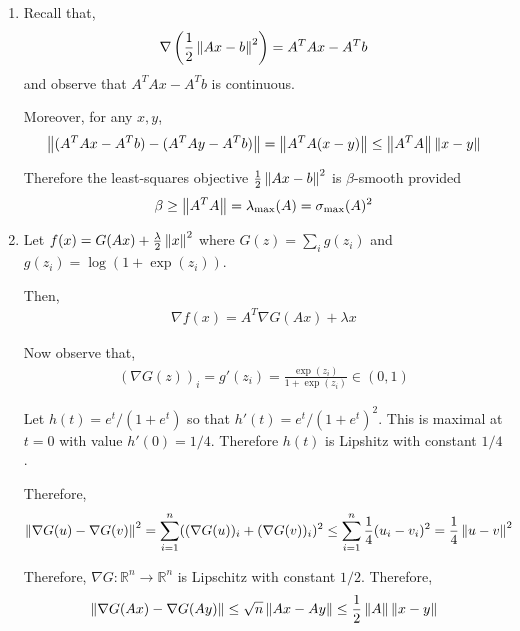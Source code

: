 \documentclass[10pt]{article}
\begin{document}
\begin{solution}[Solution]
\begin{enumerate}[label=(\alph*)]
    \item
        Recall that,
        \begin{align*}
            \nabla \left(\frac{1}{2} \left\lVert Ax-b\right\rVert^2\right)
            = A^TAx - A^Tb
        \end{align*}
        and observe that \( A^TAx-A^Tb \) is continuous.

        Moreover, for any \( x,y \),
        \begin{align*}
            \left\lVert(A^TAx-A^Tb) - (A^TAy-A^Tb)\right\rVert
            = \left\lVert A^TA(x-y)\right\rVert
            \leq \left\lVert A^TA\right\rVert \left\lVert x-y\right\rVert
        \end{align*}
        
        Therefore the least-squares objective \( \frac{1}{2}\left\lVert Ax-b\right\rVert^2 \) is \( \beta \)-smooth provided
        \begin{align*}
            \beta \geq \left\lVert A^TA\right\rVert = \lambda_{\max}(A) = \sigma_{\max}(A)^2
        \end{align*}

    \item
        Let \( f(x) = G(Ax) + \frac{\lambda}{2} \left\lVert x\right\rVert^2 \) where \( G(z) = \sum_{i} g(z_i) \) and \( g(z_i) = \log(1+\exp(z_i)) \).

        Then,
        \begin{align*}
            \nabla f(x) = A^T \nabla G(Ax) + \lambda x
        \end{align*}

        Now observe that,
        \begin{align*}
            (\nabla G(z))_i = g'(z_i) = \frac{\exp(z_i)}{1+\exp(z_i)} \in(0, 1)
        \end{align*}
        
        Let \( h(t) = e^t/(1+e^t) \) so that \( h'(t) = e^{t}/(1+e^t)^2 \). This is maximal at \( t=0 \) with value \( h'(0) = 1/4 \). Therefore \( h(t) \) is Lipshitz with constant \( 1/4 \).

        Therefore,
        \begin{align*}
            \left\lVert\nabla G(u) - \nabla G(v)\right\rVert^2 
            &= \sum_{i=1}^{n} ((\nabla G(u))_i + (\nabla G(v))_i)^2
            \leq \sum_{i=1}^{n} \frac{1}{4}(u_i-v_i)^2
            = \frac{1}{4}\left\lVert u-v\right\rVert^2
        \end{align*}
        
        Therefore, \( \nabla G : \mathbb{R}^n \to \mathbb{R}^n \) is Lipschitz with constant \( 1/2 \). Therefore, 
        \begin{align*}
            \left\lVert\nabla G(Ax) - \nabla G(Ay)\right\rVert \leq \sqrt{n}\left\lVert Ax - Ay\right\rVert
            \leq \frac{1}{2} \left\lVert A\right\rVert \left\lVert x-y\right\rVert
        \end{align*}
        


\end{enumerate}
\end{solution}
\end{document}
